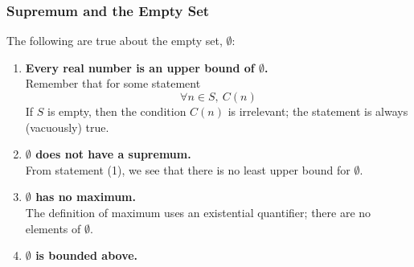\documentclass[11pt]{article}
\begin{document}
\subsubsection{Supremum and the Empty Set}
The following are true about the empty set, $\emptyset$:
\begin{enumerate}
    \item \textbf{Every real number is an upper bound of $\emptyset$.} \\
          Remember that for some statement
          $$\forall n\in S,~C(n)$$
          If $S$ is empty, then the condition $C(n)$ is irrelevant; the statement is always (vacuously) true.
    \item \textbf{$\emptyset$ does not have a supremum.} \\
          From statement (1), we see that there is no least upper bound for $\emptyset$.
    \item \textbf{$\emptyset$ has no maximum.} \\
          The definition of maximum uses an existential quantifier; there are no elements of $\emptyset$.
    \item \textbf{$\emptyset$ is bounded above.}
\end{enumerate}
\end{document}
